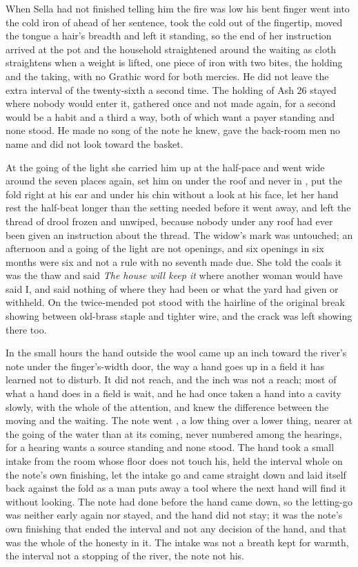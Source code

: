 When Sella had not finished telling him the fire was low his bent finger went into the cold iron of  ahead of her sentence, took the cold out of the fingertip, moved the tongue a hair's breadth and left it standing, so the end of her instruction arrived at the pot and the household straightened around the waiting as cloth straightens when a weight is lifted, one piece of iron with two bites, the holding and the taking, with no Grathic word for both mercies. He did not leave the extra interval of the twenty-sixth a second time. The holding of Ash 26 stayed where nobody would enter it, gathered once and not made again, for a second would be a habit and a third a way, both of which want a payer standing and none stood. He made no song of the note he knew, gave the back-room men no name and did not look toward the basket.

\scenebreak

At the going of the light she carried him up at the half-pace and went wide around the seven places again, set him on  under the roof and never in , put the fold right at his ear and under his chin without a look at his face, let her hand rest the half-beat longer than the setting needed before it went away, and left the thread of drool frozen and unwiped, because nobody under any roof had ever been given an instruction about the thread. The widow's mark was untouched; an afternoon and a going of the light are not openings, and six openings in six months were six and not a rule with no seventh made due. She told the coals it was the thaw and said \emph{The house will keep it} where another woman would have said I, and said nothing of where they had been or what the yard had given or withheld. On  the twice-mended pot stood with the hairline of the original break showing between old-brass staple and tighter wire, and the crack was left showing there too.

In the small hours the hand outside the wool came up an inch toward the river's note under the finger's-width door, the way a hand goes up in a field it has learned not to disturb. It did not reach, and the inch was not a reach; most of what a hand does in a field is wait, and he had once taken a hand into a cavity slowly, with the whole of the attention, and knew the difference between the moving and the waiting. The note went , a low thing over a lower thing, nearer at the going of the water than at its coming, never numbered among the hearings, for a hearing wants a source standing and none stood. The hand took a small intake from the room whose floor does not touch his, held the interval whole on the note's own finishing, let the intake go and came straight down and laid itself back against the fold as a man puts away a tool where the next hand will find it without looking. The note had done before the hand came down, so the letting-go was neither early again nor stayed, and the hand did not stay; it was the note's own finishing that ended the interval and not any decision of the hand, and that was the whole of the honesty in it. The intake was not a breath kept for warmth, the interval not a stopping of the river, the note not his.

